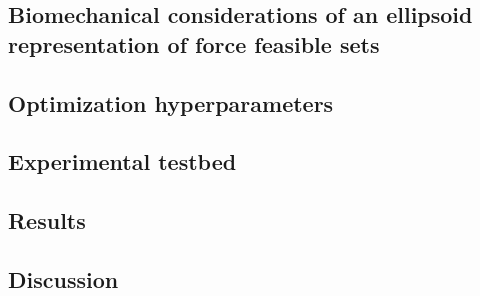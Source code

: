\subsection{Biomechanical considerations of an ellipsoid representation of force feasible sets}
\subsection{Optimization hyperparameters}
\subsection{Experimental testbed}
\subsection{Results}
\subsection{Discussion}
